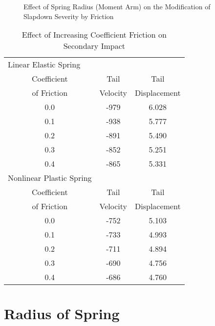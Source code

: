 \begin{figure}
\vspace{3.5 in}
\caption{Effect of Spring Radius (Moment Arm) on the Modification of
Slapdown Severity by Friction}
\end{figure}

\begin{table}
\begin{center}
\caption{Effect of Increasing Coefficient Friction on Secondary
Impact}
\begin{tabular}{||c|c|c||}
\hline
\multicolumn{1}{||l|}{Linear Elastic Spring} & &\\
     Coefficient            &Tail                  &Tail\\
     of Friction          &Velocity            &Displacement\\
         0.0               &-979                   &6.028\\
         0.1               &-938                   &5.777\\
         0.2               &-891                   &5.490\\
         0.3               &-852                   &5.251\\
         0.4               &-865                   &5.331\\
\hline
\multicolumn{1}{||l|}{Nonlinear Plastic Spring} & & \\
     Coefficient            &Tail                  &Tail\\
     of Friction          &Velocity            &Displacement\\
         0.0               &-752                   &5.103\\
         0.1               &-733                   &4.993\\
         0.2               &-711                   &4.894\\
         0.3               &-690                   &4.756\\
         0.4               &-686                   &4.760\\
\hline
\end{tabular}
\end{center}
\end{table}

\section{Radius of Spring}

